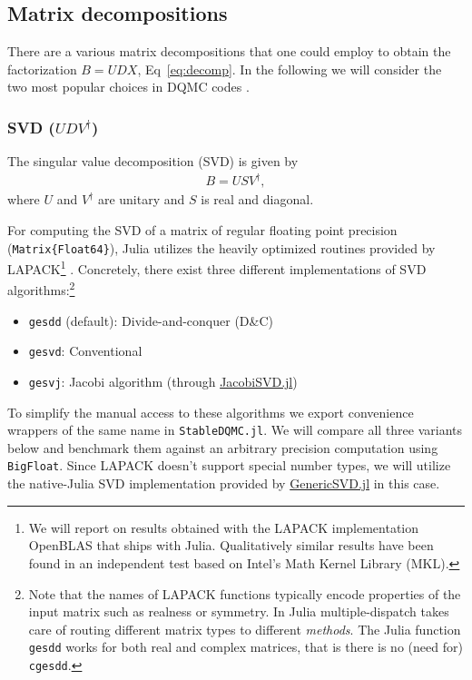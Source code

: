 \documentclass[submission, Phys]{SciPost}
\begin{document}
\subsection{Matrix decompositions}

There are a various matrix decompositions that one could employ to obtain the factorization ${B = UDX}$, Eq~\eqref{eq:decomp}. In the following we will consider the two most popular choices in DQMC codes \cite{Assaad2002a, Loh1989, Santos2003}.

\subsubsection{SVD ($UDV^\dagger$)}
The singular value decomposition (SVD) is given by
\begin{align}
	B = USV^\dagger,
\end{align}
where $U$ and $V^\dagger$ are unitary and $S$ is real and diagonal.

For computing the SVD of a matrix of regular floating point precision (\texttt{Matrix\{Float64\}}), Julia utilizes the heavily optimized routines provided by LAPACK\footnote{We will report on results obtained with the LAPACK implementation OpenBLAS that ships with Julia. Qualitatively similar results have been found in an independent test based on Intel's Math Kernel Library (MKL).} \cite{LAPACK}. Concretely, there exist three different implementations of SVD algorithms:\footnote{Note that the names of LAPACK functions typically encode properties of the input matrix such as realness or symmetry. In Julia multiple-dispatch takes care of routing different matrix types to different \textit{methods}. The Julia function \texttt{gesdd} works for both real and complex matrices, that is there is no (need for) \texttt{cgesdd}.}
\begin{itemize}
	\item \texttt{gesdd} (default): Divide-and-conquer (D\&C)
	\item \texttt{gesvd}: Conventional
	\item \texttt{gesvj}: Jacobi algorithm (through \href{https://github.com/RalphAS/JacobiSVD.jl}{JacobiSVD.jl})
\end{itemize}
To simplify the manual access to these algorithms we export convenience wrappers of the same name in \texttt{StableDQMC.jl}. We will compare all three variants below and benchmark them against an arbitrary precision computation using \texttt{BigFloat}. Since LAPACK doesn't support special number types, we will utilize the native-Julia SVD implementation provided by \href{https://github.com/JuliaLinearAlgebra/GenericSVD.jl/}{GenericSVD.jl} in this case.
\end{document}
